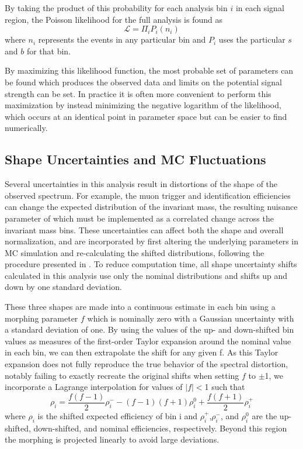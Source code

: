By taking the product of this probability for each analysis bin $i$ in each signal region, the Poisson likelihood for the full analysis is found as
\begin{equation}
	\mathcal{L} = \Pi_{i} P_i (n_i)
\end{equation}
where $n_i$ represents the events in any particular bin and $P_i$ uses the particular $s$ and $b$ for that bin.

By maximizing this likelihood function, the most probable set of parameters can be found which produces the observed data and limits on the potential signal strength can be set.
In practice it is often more convenient to perform this maximization by instead minimizing the negative logarithm of the likelihood, which occurs at an identical point in parameter space but can be easier to find numerically.

\subsection{Shape Uncertainties and MC Fluctuations}
Several uncertainties in this analysis result in distortions of the shape of the observed spectrum. 
For example, the muon trigger and identification efficiencies can change the expected distribution of the invariant mass, the resulting nuisance parameter of which must be implemented as a correlated change across the invariant mass bins.
These uncertainties can affect both the shape and overall normalization, and are incorporated by first altering the underlying parameters in MC simulation and re-calculating the shifted distributions, following the procedure presented in \cite{conway2011}.
To reduce computation time, all shape uncertainty shifts calculated in this analysis use only the nominal distributions and shifts up and down by one standard deviation.

These three shapes are made into a continuous estimate in each bin using a morphing parameter $f$ which is nominally zero with a Gaussian uncertainty with a standard deviation of one.
By using the values of the up- and down-shifted bin values as measures of the first-order Taylor expansion around the nominal value in each bin, we can then extrapolate the shift for any given f. 
As this Taylor expansion does not fully reproduce the true behavior of the spectral distortion, notably failing to exactly recreate the original shifts when setting $f$ to $\pm$1, we incorporate a Lagrange interpolation for values of $|f|<$1 such that
\begin{equation}
	\rho_i = \frac{f(f-1)}{2}\rho_{i}^{-} - (f-1)(f+1)\rho_{i}^0 + \frac{f(f+1)}{2}\rho_{i}^{+}
\end{equation}
where $\rho_i$ is the shifted expected efficiency of bin i and $\rho_{i}^+$,$\rho_{i}^-$, and $\rho_{i}^0$ are the up-shifted, down-shifted, and nominal efficiencies, respectively.
Beyond this region the morphing is projected linearly to avoid large deviations. 

